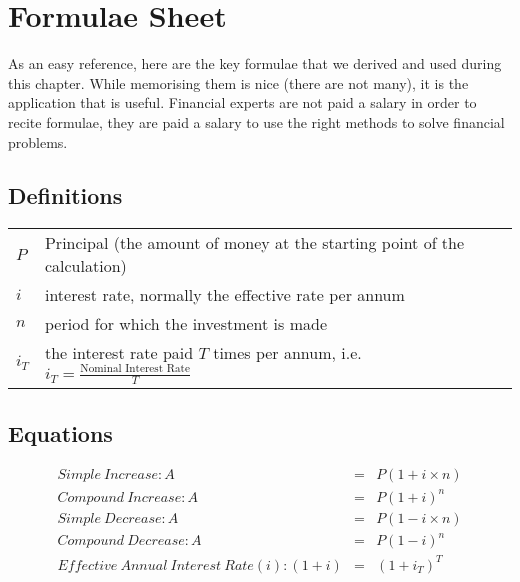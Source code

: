 
\section{Formulae Sheet}
As an easy reference, here are the key formulae that we derived and used during this chapter. While memorising them is nice (there are not many), it is the application that is useful. Financial experts are not paid a salary in order to recite formulae, they are paid a salary to use the right methods to solve financial problems.

\subsection{Definitions}
\begin{tabular}{ll}
$P$ &Principal (the amount of money at the starting point of the calculation)\\
$i$ &interest rate, normally the effective rate per annum\\
$n$ &period for which the investment is made\\
$i_T$ &the interest rate paid $T$ times per annum, i.e. $i_T = \frac{\mbox{Nominal Interest Rate}}{T}$
\end{tabular}

\subsection{Equations}

\begin{eqnarray*}
Simple~ Increase: A &=& P(1 + i \times n)\\
Compound~ Increase: A &=& P(1 + i)^n\\
Simple~ Decrease: A &=& P(1 - i \times n)\\
Compound~ Decrease: A &=& P(1 - i)^n\\
Effective~ Annual~ Interest~ Rate (i):  (1 + i) &=& (1 + i_T)^T
\end{eqnarray*}

